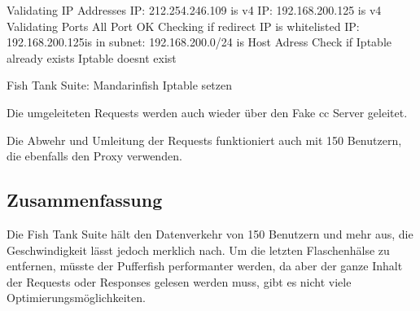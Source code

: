 \begin{listing}[H]
\begin{fancycode}
Validating IP Addresses
IP: 212.254.246.109 is v4
IP: 192.168.200.125 is v4
Validating Ports
All Port OK
Checking if redirect IP is whitelisted
IP: 192.168.200.125is in subnet: 192.168.200.0/24
is Host Adress
Check if Iptable already exists
Iptable doesnt exist
\end{fancycode}
\caption{Fish Tank Suite: Mandarinfish Iptable setzen}
\label{lst:mandarinfish-Iptable-setzen}
\end{listing}

Die umgeleiteten Requests werden auch wieder über den Fake \gls{cc} Server geleitet.

Die Abwehr und Umleitung der Requests funktioniert auch mit 150 Benutzern, die ebenfalls den Proxy verwenden.


\subsection{Zusammenfassung}
Die Fish Tank Suite hält den Datenverkehr von 150 Benutzern und mehr aus, die Geschwindigkeit lässt jedoch merklich nach.
Um die letzten Flaschenhälse zu entfernen, müsste der Pufferfish performanter werden, da aber der ganze Inhalt der Requests oder Responses gelesen werden muss, gibt es nicht viele Optimierungsmöglichkeiten.

